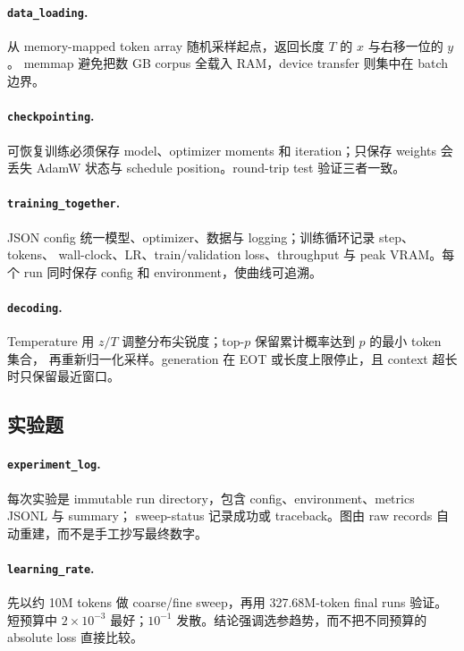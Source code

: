 \paragraph{\texttt{data\_loading}.}
从 memory-mapped token array 随机采样起点，返回长度 $T$ 的 $x$ 与右移一位的 $y$。
memmap 避免把数 GB corpus 全载入 RAM，device transfer 则集中在 batch 边界。

\paragraph{\texttt{checkpointing}.}
可恢复训练必须保存 model、optimizer moments 和 iteration；只保存 weights 会丢失
AdamW 状态与 schedule position。round-trip test 验证三者一致。

\paragraph{\texttt{training\_together}.}
JSON config 统一模型、optimizer、数据与 logging；训练循环记录 step、tokens、
wall-clock、LR、train/validation loss、throughput 与 peak VRAM。每个 run 同时保存
config 和 environment，使曲线可追溯。

\paragraph{\texttt{decoding}.}
Temperature 用 $z/T$ 调整分布尖锐度；top-$p$ 保留累计概率达到 $p$ 的最小 token 集合，
再重新归一化采样。generation 在 EOT 或长度上限停止，且 context 超长时只保留最近窗口。

\subsection{实验题}
\paragraph{\texttt{experiment\_log}.}
每次实验是 immutable run directory，包含 config、environment、metrics JSONL 与 summary；
sweep-status 记录成功或 traceback。图由 raw records 自动重建，而不是手工抄写最终数字。

\paragraph{\texttt{learning\_rate}.}
先以约 10M tokens 做 coarse/fine sweep，再用 327.68M-token final runs 验证。
短预算中 $2\times10^{-3}$ 最好；$10^{-1}$ 发散。结论强调选参趋势，而不把不同预算的
absolute loss 直接比较。

